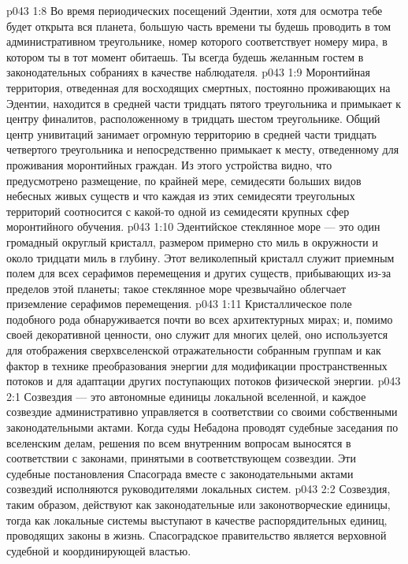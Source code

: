 \vs p043 1:8 Во время периодических посещений Эдентии, хотя для осмотра тебе будет открыта вся планета, большую часть времени ты будешь проводить в том административном треугольнике, номер которого соответствует номеру мира, в котором ты в тот момент обитаешь. Ты всегда будешь желанным гостем в законодательных собраниях в качестве наблюдателя.
\vs p043 1:9 Моронтийная территория, отведенная для восходящих смертных, постоянно проживающих на Эдентии, находится в средней части тридцать пятого треугольника и примыкает к центру финалитов, расположенному в тридцать шестом треугольнике. Общий центр унивитаций занимает огромную территорию в средней части тридцать четвертого треугольника и непосредственно примыкает к месту, отведенному для проживания моронтийных граждан. Из этого устройства видно, что предусмотрено размещение, по крайней мере, семидесяти больших видов небесных живых существ и что каждая из этих семидесяти треугольных территорий соотносится с какой\hyp{}то одной из семидесяти крупных сфер моронтийного обучения.
\vs p043 1:10 Эдентийское стеклянное море --- это один громадный округлый кристалл, размером примерно сто миль в окружности и около тридцати миль в глубину. Этот великолепный кристалл служит приемным полем для всех серафимов перемещения и других существ, прибывающих из\hyp{}за пределов этой планеты; такое стеклянное море чрезвычайно облегчает приземление серафимов перемещения.
\vs p043 1:11 Кристаллическое поле подобного рода обнаруживается почти во всех архитектурных мирах; и, помимо своей декоративной ценности, оно служит для многих целей, оно используется для отображения сверхвселенской отражательности собранным группам и как фактор в технике преобразования энергии для модификации пространственных потоков и для адаптации других поступающих потоков физической энергии.
\vs p043 2:1 Созвездия --- это автономные единицы локальной вселенной, и каждое созвездие административно управляется в соответствии со своими собственными законодательными актами. Когда суды Небадона проводят судебные заседания по вселенским делам, решения по всем внутренним вопросам выносятся в соответствии с законами, принятыми в соответствующем созвездии. Эти судебные постановления Спасограда вместе с законодательными актами созвездий исполняются руководителями локальных систем.
\vs p043 2:2 Созвездия, таким образом, действуют как законодательные или законотворческие единицы, тогда как локальные системы выступают в качестве распорядительных единиц, проводящих законы в жизнь. Спасоградское правительство является верховной судебной и координирующей властью.
